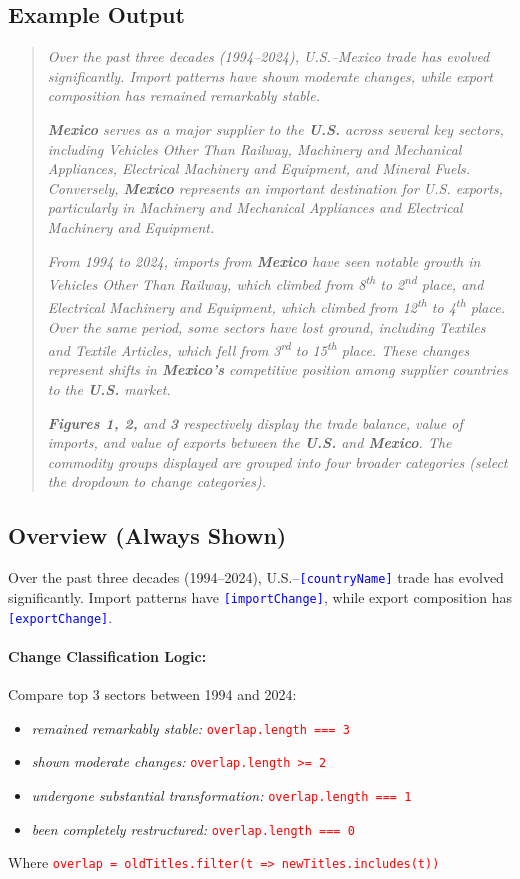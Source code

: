 \documentclass[12pt]{article}
\newcommand{\var}[1]{\textcolor{blue}{\texttt{[#1]}}}
\newcommand{\cond}[1]{\textcolor{red}{\texttt{#1}}}
\begin{document}
\subsection{Example Output}
\begin{quote}
\textit{Over the past three decades (1994--2024), U.S.--Mexico trade has evolved significantly. Import patterns have shown moderate changes, while export composition has remained remarkably stable.}

\textit{\textbf{Mexico} serves as a major supplier to the \textbf{U.S.} across several key sectors, including Vehicles Other Than Railway, Machinery and Mechanical Appliances, Electrical Machinery and Equipment, and Mineral Fuels. Conversely, \textbf{Mexico} represents an important destination for U.S. exports, particularly in Machinery and Mechanical Appliances and Electrical Machinery and Equipment.}

\textit{From 1994 to 2024, imports from \textbf{Mexico} have seen notable growth in Vehicles Other Than Railway, which climbed from 8\textsuperscript{th} to 2\textsuperscript{nd} place, and Electrical Machinery and Equipment, which climbed from 12\textsuperscript{th} to 4\textsuperscript{th} place. Over the same period, some sectors have lost ground, including Textiles and Textile Articles, which fell from 3\textsuperscript{rd} to 15\textsuperscript{th} place. These changes represent shifts in \textbf{Mexico's} competitive position among supplier countries to the \textbf{U.S.} market.}

\textit{\textbf{Figures 1, 2,} and \textbf{3} respectively display the trade balance, value of imports, and value of exports between the \textbf{U.S.} and \textbf{Mexico}. The commodity groups displayed are grouped into four broader categories (select the dropdown to change categories).}
\end{quote}

\subsection{Overview (Always Shown)}
Over the past three decades (1994--2024), U.S.--\var{countryName} trade has evolved significantly. Import patterns have \var{importChange}, while export composition has \var{exportChange}.

\paragraph{Change Classification Logic:}
Compare top 3 sectors between 1994 and 2024:
\begin{itemize}[noitemsep]
\item \textit{remained remarkably stable:} \cond{overlap.length === 3}
\item \textit{shown moderate changes:} \cond{overlap.length >= 2}  
\item \textit{undergone substantial transformation:} \cond{overlap.length === 1}
\item \textit{been completely restructured:} \cond{overlap.length === 0}
\end{itemize}
Where \cond{overlap = oldTitles.filter(t => newTitles.includes(t))}
\end{document}
